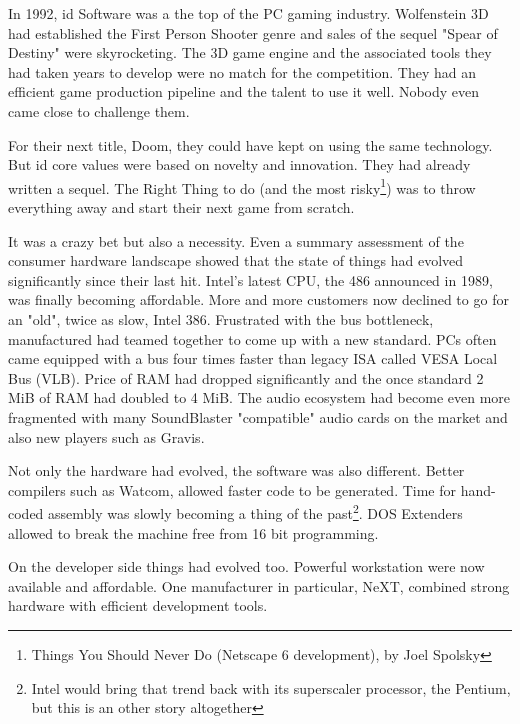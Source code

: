 In 1992, id Software was a the top of the PC gaming industry. Wolfenstein 3D had established the First
Person Shooter genre and sales of the sequel "Spear of Destiny" were skyrocketing. The 3D game engine and the associated 
tools they had taken years to develop were no match for the competition. They had an efficient game production pipeline and the talent to use it well. Nobody even came close to challenge them.\\
\par
For their next title, Doom, they could have kept on using the same technology. But id core values were based on novelty and innovation. They had already written a sequel. The Right Thing to do (and the most risky\footnote{Things You Should Never Do (Netscape 6 development), by Joel Spolsky}) was to throw everything away and start their next game from scratch.\\
\par
It was a crazy bet but also a necessity. Even a summary assessment of the consumer hardware landscape showed that the state of things had evolved significantly since their last hit. Intel's latest CPU, the 486 announced in 1989, was finally becoming affordable. More and more customers now declined to go for an "old", twice as slow, Intel 386. Frustrated with the bus bottleneck, manufactured had teamed together to come up with a new standard. PCs often came equipped with a bus four times faster than legacy ISA called VESA Local Bus (VLB). Price of RAM had dropped significantly and the once standard 2 MiB of RAM had doubled to 4 MiB. The audio ecosystem had become even more fragmented with many SoundBlaster "compatible" audio cards on the market and also new players such as Gravis.\\
 \par 
 Not only the hardware had evolved, the software was also different. Better compilers such as Watcom, allowed faster code to be generated. Time for hand-coded assembly was slowly becoming a thing of the past\footnote{Intel would bring that trend back with its superscaler processor, the Pentium, but this is an other story altogether}. DOS Extenders allowed to break the machine free from 16 bit programming.\\
 \par
 On the developer side things had evolved too. Powerful workstation were now available and affordable. One manufacturer in particular, NeXT, combined strong hardware with efficient development tools.\\
 \par
